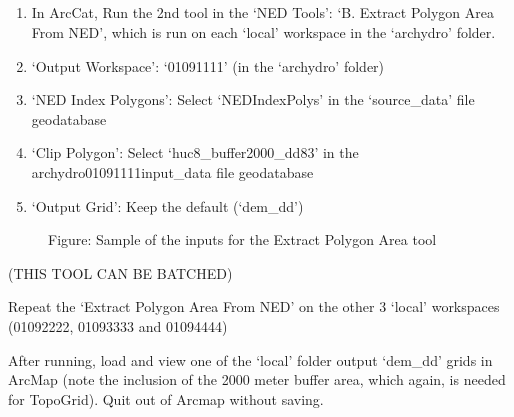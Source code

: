\documentclass[letterpaper,10pt,english]{sphinxmanual}
\begin{document}
\subparagraph{}
\label{\detokenize{ex_1:step-2b-extract-polygon-area-from-ned}}\begin{enumerate}
\def\theenumi{\arabic{enumi}}
\def\labelenumi{\theenumi .}
\makeatletter\def\p@enumii{\p@enumi \theenumi .}\makeatother
\setcounter{enumi}{7}
\item {} 
In ArcCat, Run the 2nd tool in the ‘NED Tools’: ‘B. Extract Polygon Area From NED’, which is run on each ‘local’ workspace in the ‘archydro’ folder.

\item {} 
‘Output Workspace’: ‘01091111’ (in the ‘archydro’ folder)

\item {} 
‘NED Index Polygons’: Select ‘NEDIndexPolys’ in the ‘source\_data’ file geodatabase

\item {} 
‘Clip Polygon’: Select ‘huc8\_buffer2000\_dd83’ in the archydro01091111input\_data file geodatabase

\item {} 
‘Output Grid’: Keep the default (‘dem\_dd’)

\end{enumerate}

\begin{figure}[htbp]
\centering
\capstart

\noindent{}
\caption{Figure: Sample of the inputs for the Extract Polygon Area tool}\label{\detokenize{ex_1:id9}}\end{figure}

(THIS TOOL CAN BE BATCHED)

Repeat the ‘Extract Polygon Area From NED’ on the other 3 ‘local’ workspaces (01092222, 01093333 and 01094444)

After running, load and view one of the ‘local’ folder output ‘dem\_dd’ grids in ArcMap (note the inclusion of the 2000 meter buffer area, which again, is needed for TopoGrid). Quit out of Arcmap without saving.
\end{document}
